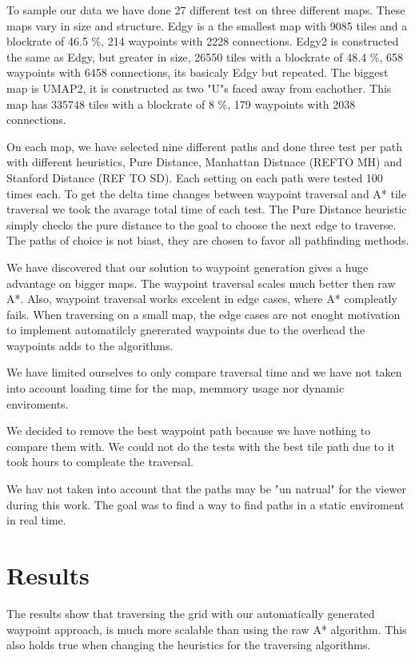\documentclass[a4paper]{article}
\begin{document}
To sample our data we have done 27 different test on three different maps. These maps vary in size and structure. Edgy is a the smallest map with 9085 tiles and a blockrate of 46.5 \%, 214 waypoints with 2228 connections. Edgy2 is constructed the same as Edgy, but greater in size, 26550 tiles with a blockrate of 48.4 \%, 658 waypoints with 6458 connections, its basicaly Edgy but repeated. The biggest map is UMAP2, it is constructed as two "U"s faced away from eachother. This map has 335748 tiles with a blockrate of 8 \%, 179 waypoints with 2038 connections.

On each map, we have selected nine different paths and done three test per path with different heuristics, Pure Distance, Manhattan Distnace (REFTO MH) and Stanford Distance (REF TO SD).
Each setting on each path were tested 100 times each. To get the delta time changes between waypoint traversal and A* tile traversal we took the avarage total time of each test.
The Pure Distance heuristic simply checks the pure distance to the goal to choose the next edge to traverse. The paths of choice is not biast, they are chosen to favor all pathfinding methods.

We have discovered that our solution to waypoint generation gives a huge advantage on bigger maps. The waypoint traversal scales much better then raw A*. Also, waypoint traversal works excelent in edge cases, where A* compleatly fails.
When traversing on a small map, the edge cases are not enoght motivation to implement automatilcly gnererated waypoints due to the overhead the waypoints adds to the algorithms.

We have limited ourselves to only compare traversal time and we have not taken into account loading time for the map, memmory usage nor dynamic enviroments.
	
We decided to remove the best waypoint path because we have nothing to compare them with. We could not do the tests with the best tile path due to it took hours to compleate the traversal.
	
We hav not taken into account that the paths may be "un natrual" for the viewer during this work. The goal was to find a way to find paths in a static enviroment in real time.

\section{Results}
The results show that traversing the grid with our automatically generated waypoint approach, is much more scalable than using the raw A* algorithm. This also holds true when changing the heuristics for the traversing algorithms.
	
\end{document}
